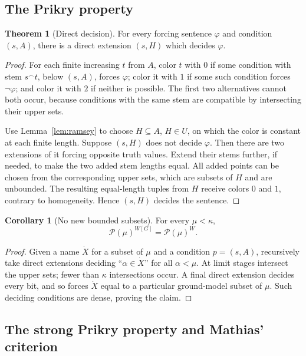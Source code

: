 \documentclass[11pt,letterpaper]{article}
\theoremstyle{definition}
\newtheorem{theorem}[definition]{Theorem}
\newtheorem{corollary}[definition]{Corollary}
\numberwithin{equation}{section}
\newcommand{\Pow}{\mathcal P}
\begin{document}
\subsection{The Prikry property}

\begin{theorem}[Direct decision]\label{thm:prikry}
For every forcing sentence $\varphi$ and condition $(s,A)$, there is a direct extension $(s,H)$ which decides $\varphi$.
\end{theorem}
\begin{proof}
For each finite increasing $t$ from $A$, color $t$ with $0$ if some condition with stem $s^\frown t$, below $(s,A)$, forces $\varphi$; color it with $1$ if some such condition forces $\neg\varphi$; and color it with $2$ if neither is possible. The first two alternatives cannot both occur, because conditions with the same stem are compatible by intersecting their upper sets.

Use Lemma~\ref{lem:ramsey} to choose $H\subseteq A$, $H\in U$, on which the color is constant at each finite length. Suppose $(s,H)$ does not decide $\varphi$. Then there are two extensions of it forcing opposite truth values. Extend their stems further, if needed, to make the two added stem lengths equal. All added points can be chosen from the corresponding upper sets, which are subsets of $H$ and are unbounded. The resulting equal-length tuples from $H$ receive colors $0$ and $1$, contrary to homogeneity. Hence $(s,H)$ decides the sentence.
\end{proof}

\begin{corollary}[No new bounded subsets]\label{cor:nobounded}
For every $\mu<\kappa$,
\[
 \Pow(\mu)^{W[G]}=\Pow(\mu)^W.
\]
\end{corollary}
\begin{proof}
Given a name $\dot X$ for a subset of $\mu$ and a condition $p=(s,A)$, recursively take direct extensions deciding ``$\alpha\in\dot X$'' for all $\alpha<\mu$. At limit stages intersect the upper sets; fewer than $\kappa$ intersections occur. A final direct extension decides every bit, and so forces $\dot X$ equal to a particular ground-model subset of $\mu$. Such deciding conditions are dense, proving the claim.
\end{proof}

\subsection{The strong Prikry property and Mathias' criterion}
\end{document}
